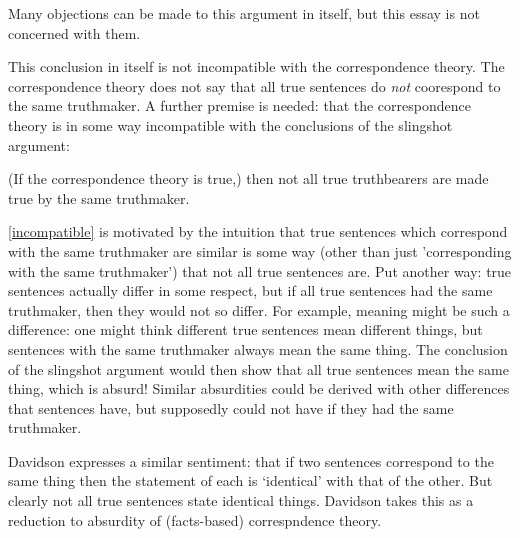 Many objections can be made to this argument in itself, but this essay is not concerned with them.

This conclusion in itself is not incompatible with the correspondence theory.
The correspondence theory does not say that all true sentences do \emph{not} coorespond to the same truthmaker.
A further premise is needed: that the correspondence theory is in some way incompatible with the conclusions of the slingshot argument:

	\begin{thesis} \label{incompatible}
	(If the correspondence theory is true,) then not all true truthbearers are made true by the same truthmaker.
	\end{thesis}

\ref{incompatible} is motivated by the intuition that true sentences which correspond with the same truthmaker are similar is some way (other than just 'corresponding with the same truthmaker') that not all true sentences are.
Put another way: true sentences actually differ in some respect, but if all true sentences had the same truthmaker, then they would not so differ.
For example, meaning might be such a difference: one might think different true sentences mean different things, but sentences with the same truthmaker always mean the same thing.
The conclusion of the slingshot argument would then show that all true sentences mean the same thing, which is absurd!
Similar absurdities could be derived with other differences that sentences have, but supposedly could not have if they had the same truthmaker.

Davidson expresses a similar sentiment: that if two sentences correspond to the same thing then the statement of each is `identical' with that of the other.
But clearly not all true sentences state identical things.
Davidson takes this as a reduction to absurdity of (facts-based) correspndence theory. %
\parencite[750]{Davidson_1969}


